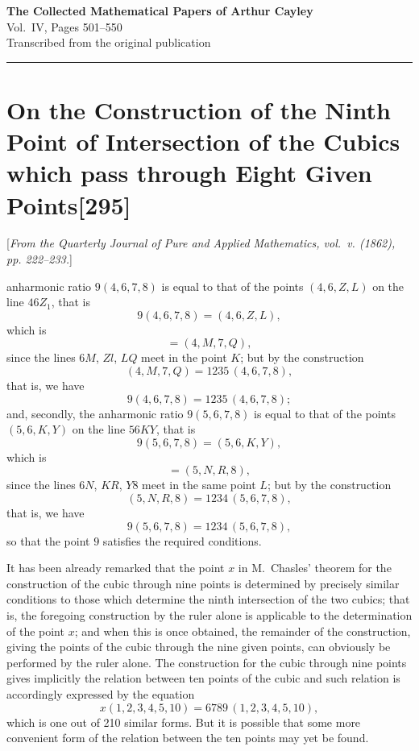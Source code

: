 \documentclass[11pt,a4paper]{article}
\newcommand{\paper}[2]{\section[#1]{#1\hfill\textnormal{[#2]}}}
\begin{document}
\begin{center}
{\Large\bfseries The Collected Mathematical Papers of Arthur Cayley}\\[6pt]
{\large Vol.~IV, Pages 501--550}\\[12pt]
{\small Transcribed from the original publication}
\end{center}

\vspace{1em}
\hrule
\vspace{1.5em}

\paper{On the Construction of the Ninth Point of Intersection of the Cubics which pass through Eight Given Points}{295}

{\small
[\textit{From the Quarterly Journal of Pure and Applied Mathematics, vol.~v. (1862), pp. 222--233.}]
\par}
\vspace{0.5em}

\setcounter{page}{501}

anharmonic ratio $9(4, 6, 7, 8)$ is equal to that of the points $(4, 6, Z, L)$ on the line $46Z_1$, that is
\[
9 (4, 6, 7, 8) = (4, 6, Z, L),
\]
which is
\[
= (4, M, 7, Q),
\]
since the lines $6M$, $Zl$, $LQ$ meet in the point $K$; but by the construction
\[
(4, M, 7, Q) = 1235\,(4, 6, 7, 8),
\]
that is, we have
\[
9 (4, 6, 7, 8) = 1235\,(4, 6, 7, 8);
\]
and, secondly, the anharmonic ratio $9(5, 6, 7, 8)$ is equal to that of the points $(5, 6, K, Y)$ on the line $56KY$, that is
\[
9(5, 6, 7, 8) = (5, 6, K, Y),
\]
which is
\[
= (5, N, R, 8),
\]
since the lines $6N$, $KR$, $Y8$ meet in the same point $L$; but by the construction
\[
(5, N, R, 8) = 1234\,(5, 6, 7, 8),
\]
that is, we have
\[
9(5, 6, 7, 8) = 1234\,(5, 6, 7, 8),
\]
so that the point $9$ satisfies the required conditions.

It has been already remarked that the point $x$ in M.~Chasles' theorem for the construction of the cubic through nine points is determined by precisely similar conditions to those which determine the ninth intersection of the two cubics; that is, the foregoing construction by the ruler alone is applicable to the determination of the point $x$; and when this is once obtained, the remainder of the construction, giving the points of the cubic through the nine given points, can obviously be performed by the ruler alone. The construction for the cubic through nine points gives implicitly the relation between ten points of the cubic and such relation is accordingly expressed by the equation
\[
x(1, 2, 3, 4, 5, 10) = 6789\,(1, 2, 3, 4, 5, 10),
\]
which is one out of 210 similar forms. But it is possible that some more convenient form of the relation between the ten points may yet be found.
\end{document}
